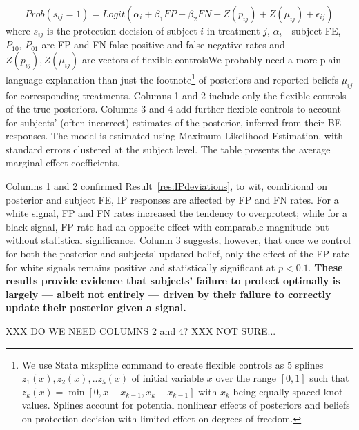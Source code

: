 \documentclass[12pt,a4paper]{article}
\newcommand{\agt}[1]{{\color{OliveGreen}#1}}
\newcommand{\pmt}[1]{{\color{Blue}#1}}
\begin{document}
	\[Prob(s_{ij}=1)=Logit(\alpha_i+\beta_1 FP +\beta_2 FN +Z(p_{ij})+Z(\mu_{ij})+\epsilon_{ij}) \]
where $s_{ij}$ is the protection decision of subject $i$ in treatment $j$, $\alpha_i$ - subject FE, $P_{10}$, $P_{01}$ are FP and FN false positive and false negative rates and $Z(p_{ij}),Z(\mu_{ij})$ are vectors of flexible controls\pmt{We probably need a more plain language explanation than just the footnote}\footnote{We use Stata mkspline command to create flexible controls as 5 splines $z_1(x),z_2(x),..z_5(x)$ of initial variable $x$ over the range $[0,1]$ such that $z_k(x)=\min[0,x-x_{k-1},x_k-x_{k-1}]$ with $x_k$ being equally spaced knot values. Splines account for potential nonlinear effects of posteriors and beliefs on protection decision with limited effect on degrees of freedom.} of posteriors and reported beliefs $\mu_{ij}$ for corresponding treatments. Columns 1 and 2 include only the flexible controls of the true posteriors. Columns 3 and 4 add further flexible controls to account for subjects' (often incorrect) estimates of the posterior, inferred from their BE responses. The model is estimated using Maximum Likelihood Estimation, with standard errors clustered at the subject level. The table presents the average marginal effect coefficients.

Columns 1 and 2 confirmed Result~\ref{res:IPdeviations}, to wit, conditional on posterior and subject FE, IP responses are affected by FP and FN rates. For a white signal, FP and FN rates increased the tendency to overprotect; while for a black signal, FP rate had an opposite effect with comparable magnitude but without statistical significance. Column 3 suggests, however, that once we control for both the posterior and subjects' updated belief, only the effect of the FP rate for white signals remains positive and statistically significant at $p<0.1$. \textbf{These results provide evidence that subjects' failure to protect optimally is largely --- albeit not entirely --- driven by their failure to correctly update their posterior given a signal.}

\agt{XXX DO WE NEED COLUMNS 2 and 4? XXX NOT SURE...}
\end{document}
